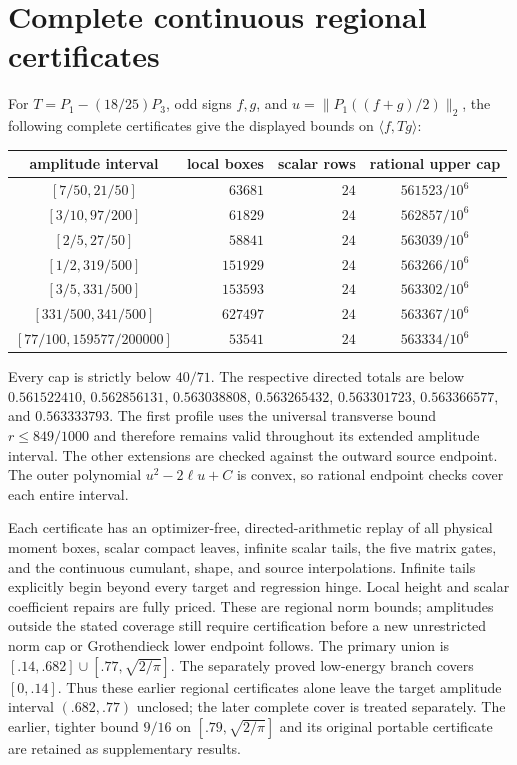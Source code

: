 \documentclass[11pt]{article}
\begin{document}
\section{Complete continuous regional certificates}\label{app:regional}
For $T=P_1-(18/25)P_3$, odd signs $f,g$, and
$u=\|P_1((f+g)/2)\|_2$, the following complete certificates give
the displayed bounds on $\langle f,Tg\rangle$:
\begin{center}
\begin{tabular}{c|r|r|c}
amplitude interval & local boxes & scalar rows & rational upper cap\\ \hline
$[7/50,21/50]$ & $63681$ & $24$ & $561523/10^6$\\
$[3/10,97/200]$ & $61829$ & $24$ & $562857/10^6$\\
$[2/5,27/50]$ & $58841$ & $24$ & $563039/10^6$\\
$[1/2,319/500]$ & $151929$ & $24$ & $563266/10^6$\\
$[3/5,331/500]$ & $153593$ & $24$ & $563302/10^6$\\
$[331/500,341/500]$ & $627497$ & $24$ & $563367/10^6$\\
$[77/100,159577/200000]$ & $53541$ & $24$ & $563334/10^6$
\end{tabular}
\end{center}
Every cap is strictly below $40/71$.
The respective directed totals are below
$0.561522410$,
$0.562856131$, $0.563038808$, $0.563265432$,
$0.563301723$, $0.563366577$, and $0.563333793$.
The first profile uses the universal transverse bound $r\le849/1000$
and therefore remains valid throughout its extended amplitude interval.
The other extensions are checked against the outward source endpoint.
The outer polynomial $u^2-2\ell u+C$ is convex, so rational endpoint
checks cover each entire interval.

Each certificate has an optimizer-free, directed-arithmetic replay of
all physical moment boxes, scalar compact leaves, infinite scalar tails,
the five matrix gates, and the continuous cumulant, shape, and source
interpolations. Infinite tails explicitly begin beyond every target and
regression hinge. Local height and scalar coefficient repairs are fully
priced. These are regional norm bounds; amplitudes outside the stated
coverage still require certification before a new unrestricted norm cap
or Grothendieck lower endpoint follows.
The primary union is $[.14,.682]\cup[.77,\sqrt{2/\pi}]$.
The separately proved low-energy branch covers $[0,.14]$.
Thus these earlier regional certificates alone leave the target amplitude
interval $(.682,.77)$ unclosed; the later complete cover is treated separately.
The earlier, tighter bound $9/16$ on $[.79,\sqrt{2/\pi}]$ and its
original portable certificate are retained as supplementary results.
\end{document}
